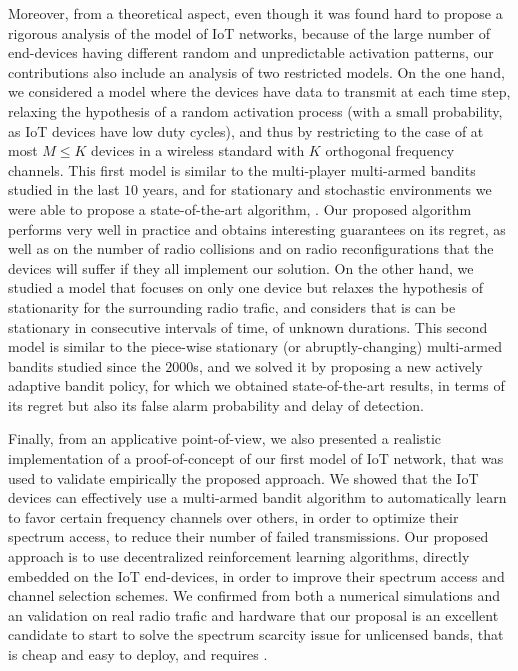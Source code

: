 Moreover, from a theoretical aspect, even though it was found hard to propose a rigorous analysis of the model of IoT networks, because of the large number of end-devices having different random and unpredictable activation patterns, our contributions also include an analysis of two restricted models.
%
On the one hand, we considered a model where the devices have data to transmit at each time step, relaxing the hypothesis of a random activation process (with a small probability, as IoT devices have low duty cycles), and thus by restricting to the case of at most $M \leq K$ devices in a wireless standard with $K$ orthogonal frequency channels.
This first model is similar to the multi-player multi-armed bandits studied in the last $10$ years, and for stationary and stochastic environments we were able to propose a state-of-the-art algorithm, \MCTopM.
Our proposed algorithm performs very well in practice and obtains interesting guarantees on its regret, as well as on the number of radio collisions and on radio reconfigurations that the devices will suffer if they all implement our solution.
%
On the other hand, we studied a model that focuses on only one device but relaxes the hypothesis of stationarity for the surrounding radio trafic, and considers that is can be stationary in consecutive intervals of time, of unknown durations. This second model is similar to the piece-wise stationary (or abruptly-changing) multi-armed bandits studied since the $2000$s, and we solved it by proposing a new actively adaptive bandit policy, for which we obtained state-of-the-art results, in terms of its regret but also its false alarm probability and delay of detection.

Finally, from an applicative point-of-view, we also presented a realistic implementation of a proof-of-concept of our first model of IoT network, that was used to validate empirically the proposed approach.
We showed that the IoT devices can effectively use a multi-armed bandit algorithm to automatically learn to favor certain frequency channels over others, in order to optimize their spectrum access, to reduce their number of failed transmissions.
%
Our proposed approach is to use decentralized reinforcement learning algorithms, directly embedded on the IoT end-devices, in order to improve their spectrum access and channel selection schemes.
We confirmed from both a numerical simulations and an validation on real radio trafic and hardware that our proposal is an excellent candidate to start to solve the spectrum scarcity issue for unlicensed bands, that is cheap and easy to deploy, and requires .



